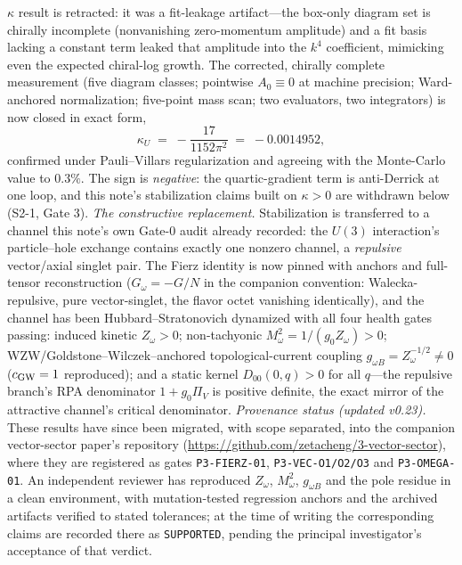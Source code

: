 \documentclass[11pt,a4paper]{article}
\begin{document}
$\kappa$ result is retracted: it was a fit-leakage artifact---the
box-only diagram set is chirally incomplete (nonvanishing
zero-momentum amplitude) and a fit basis lacking a constant term
leaked that amplitude into the $k^4$ coefficient, mimicking even
the expected chiral-log growth.  The corrected, chirally complete
measurement (five diagram classes; pointwise $A_0 \equiv 0$ at
machine precision; Ward-anchored normalization; five-point mass
scan; two evaluators, two integrators) is now closed in exact
form,
\begin{equation}
\kappa_U \;=\; -\frac{17}{1152\pi^2} \;=\; -0.0014952,
\end{equation}
confirmed under Pauli--Villars regularization and agreeing with
the Monte-Carlo value to $0.3\%$.  The sign is \emph{negative}:
the quartic-gradient term is anti-Derrick at one loop, and this
note's stabilization claims built on $\kappa > 0$ are withdrawn
below (S2-1, Gate 3).
\emph{The constructive replacement.}  Stabilization is
transferred to a channel this note's own Gate-0 audit already
recorded: the $U(3)$ interaction's particle--hole exchange
contains exactly one nonzero channel, a \emph{repulsive}
vector/axial singlet pair.  The Fierz identity is now pinned with
anchors and full-tensor reconstruction ($G_\omega = -G/N$ in the
companion convention: Walecka-repulsive, pure vector-singlet, the
flavor octet vanishing identically), and the channel has been
Hubbard--Stratonovich dynamized with all four health gates
passing: induced kinetic $Z_\omega > 0$; non-tachyonic
$M_\omega^2 = 1/(g_0 Z_\omega) > 0$; WZW/Goldstone--Wilczek--anchored topological-current coupling
$g_{\omega B} = Z_\omega^{-1/2} \neq 0$
($c_{\rm GW} = 1$ reproduced); and a static
kernel $D_{00}(0,q) > 0$ for all $q$---the repulsive branch's RPA
denominator $1 + g_0\Pi_V$ is positive definite, the exact mirror
of the attractive channel's critical denominator.
\emph{Provenance status (updated v0.23).}  These results have
since been migrated, with scope separated, into the companion
vector-sector paper's repository
(\url{https://github.com/zetacheng/3-vector-sector}), where they
are registered as gates \texttt{P3-FIERZ-01},
\texttt{P3-VEC-O1/O2/O3} and \texttt{P3-OMEGA-01}.  An independent
reviewer has reproduced $Z_\omega$, $M_\omega^2$, $g_{\omega B}$
and the pole residue in a clean environment, with
mutation-tested regression anchors and the archived artifacts
verified to stated tolerances; at the time of writing the
corresponding claims are recorded there as \texttt{SUPPORTED},
pending the principal investigator's acceptance of that verdict.
\end{document}
